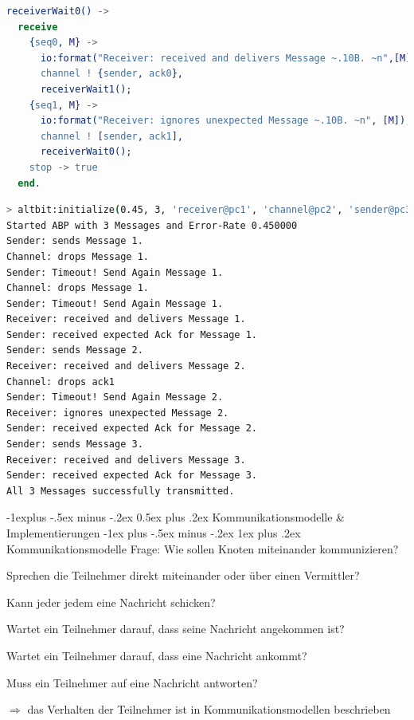 \documentclass[10pt]{article}
\makeatletter
\renewcommand{\subsection}{\@startsection{subsection}{2}{0mm}%
                                {-1explus -.5ex minus -.2ex}%
                                {0.5ex plus .2ex}%
                                {\normalfont\normalsize\bfseries}}
\renewcommand{\subsubsection}{\@startsection{subsubsection}{3}{0mm}%
                                {-1ex plus -.5ex minus -.2ex}%
                                {1ex plus .2ex}%
                                {\normalfont\small\bfseries}}
\makeatother
\begin{document}
  \begin{lstlisting}[language=erlang]
receiverWait0() ->
  receive
    {seq0, M} ->
      io:format("Receiver: received and delivers Message ~.10B. ~n",[M]),
      channel ! {sender, ack0},
      receiverWait1();
    {seq1, M} ->
      io:format("Receiver: ignores unexpected Message ~.10B. ~n", [M]),
      channel ! [sender, ack1],
      receiverWait0();
    stop -> true
  end.  
\end{lstlisting}
  
  \begin{lstlisting}[language=bash]
> altbit:initialize(0.45, 3, 'receiver@pc1', 'channel@pc2', 'sender@pc3').
Started ABP with 3 Messages and Error-Rate 0.450000
Sender: sends Message 1.
Channel: drops Message 1.
Sender: Timeout! Send Again Message 1.
Channel: drops Message 1.
Sender: Timeout! Send Again Message 1.
Receiver: received and delivers Message 1.
Sender: received expected Ack for Message 1.
Sender: sends Message 2.
Receiver: received and delivers Message 2.
Channel: drops ack1
Sender: Timeout! Send Again Message 2.
Receiver: ignores unexpected Message 2.
Sender: received expected Ack for Message 2.
Sender: sends Message 3.
Receiver: received and delivers Message 3.
Sender: received expected Ack for Message 3.
All 3 Messages successfully transmitted.
\end{lstlisting}
  
  \subsection{Kommunikationsmodelle \& Implementierungen}
  \subsubsection{Kommunikationsmodelle}
  Frage: Wie sollen Knoten miteinander kommunizieren? 
  \begin{itemize*}
    \item Sprechen die Teilnehmer direkt miteinander oder über einen Vermittler?
    \item Kann jeder jedem eine Nachricht schicken?
    \item Wartet ein Teilnehmer darauf, dass seine Nachricht angekommen ist?
    \item Wartet ein Teilnehmer darauf, dass eine Nachricht ankommt?
    \item Muss ein Teilnehmer auf eine Nachricht antworten?
  \end{itemize*}
$\Rightarrow$ das Verhalten der Teilnehmer ist in \color{orange} Kommunikationsmodellen \color{black} beschrieben
  
\end{document}
